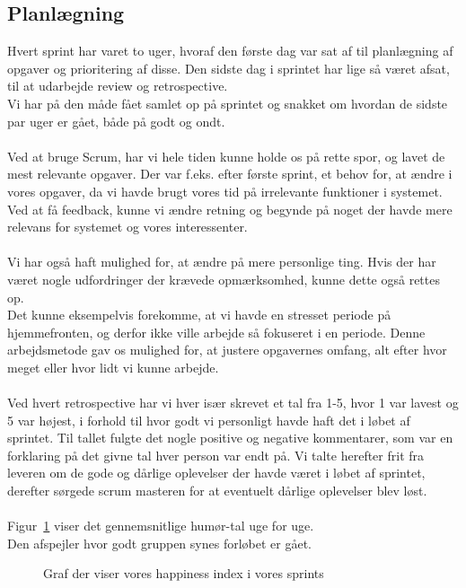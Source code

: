 \subsection{Planlægning}
Hvert sprint har varet to uger, hvoraf den første dag var sat af til planlægning af opgaver og prioritering af disse.
Den sidste dag i sprintet har lige så været afsat, til at udarbejde review og retrospective.
\\
Vi har på den måde fået samlet op på sprintet og snakket om hvordan de sidste par uger er gået, både på godt og ondt.
\\\\
Ved at bruge Scrum, har vi hele tiden kunne holde os på rette spor, og lavet de mest relevante opgaver.
Der var f.eks. efter første sprint, et behov for, at ændre i vores opgaver, da vi havde brugt vores tid på irrelevante funktioner i systemet.
Ved at få feedback, kunne vi ændre retning og begynde på noget der havde mere relevans for systemet og vores interessenter.
\\\\
Vi har også haft mulighed for, at ændre på mere personlige ting.
Hvis der har været nogle udfordringer der krævede opmærksomhed, kunne dette også rettes op.
\\
Det kunne eksempelvis forekomme, at vi havde en stresset periode på hjemmefronten, og derfor ikke ville arbejde så fokuseret i en periode.
Denne arbejdsmetode gav os mulighed for, at justere opgavernes omfang, alt efter hvor meget eller hvor lidt vi kunne arbejde.
\\\\
Ved hvert retrospective har vi hver især skrevet et tal fra 1-5, hvor 1 var lavest og 5 var højest, i forhold til hvor godt vi personligt havde haft det i løbet af sprintet.
Til tallet fulgte det nogle positive og negative kommentarer, som var en forklaring på det givne tal hver person var endt på.
Vi talte herefter frit fra leveren om de gode og dårlige oplevelser der havde været i løbet af sprintet, derefter sørgede scrum masteren for at
eventuelt dårlige oplevelser blev løst.
\\\\
Figur~\ref{fig:happi} viser det gennemsnitlige humør-tal uge for uge.
\\
Den afspejler hvor godt gruppen synes forløbet er gået.
\begin{figure}[H]
    \caption{Graf der viser vores happiness index i vores sprints}
    \label{fig:happi}
\end{figure}
